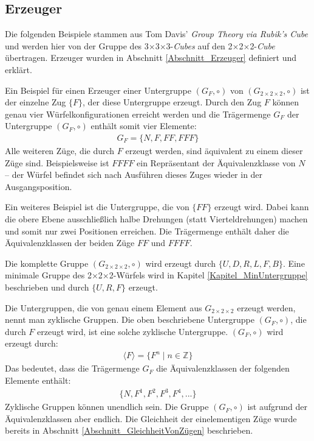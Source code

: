 \documentclass[12pt,a4paper, usenames, dvipsnames]{article}
\theoremstyle{mystyle}
\theoremstyle{definition}
\newcommand{\Gtwo}{\ensuremath{G_{2\times 2\times 2}}}
\newcommand{\Ttwo}{2$\times$2$\times$2-}
\newcommand{\Tthree}{3$\times$3$\times$3-}
\begin{document}
%
%
%
%
%
%
%
%
%
%
%
%
%
%
%
%
%
%
%
%

\subsection{Erzeuger}
\label{Abschnitt_ErzeugerGF}

Die folgenden Beispiele stammen aus Tom Davis' \textit{Group Theory via Rubik's Cube} \cite{TD} und werden hier von der Gruppe des \Tthree \textit{Cubes} auf den \Ttwo \textit{Cube} übertragen. Erzeuger wurden in Abschnitt \ref{Abschnitt_Erzeuger} definiert und erklärt.


Ein Beispiel für einen Erzeuger einer Untergruppe $(G_F, \circ)$ von $(\Gtwo, \circ)$ ist der einzelne Zug $\{ F \}$, der diese Untergruppe erzeugt. Durch den Zug $F$ können genau vier Würfelkonfigurationen erreicht werden und die Trägermenge $G_F$ der Untergruppe $(G_F, \circ)$ enthält somit vier Elemente:
\begin{align*}
G_F = \{N, F, FF, FFF\}
\end{align*}
Alle weiteren Züge, die durch $F$ erzeugt werden, sind äquivalent zu einem dieser Züge sind. Beispielsweise ist $FFFF$ ein Repräsentant der Äquivalenzklasse von $N$ -- der Würfel befindet sich nach Ausführen dieses Zuges wieder in der Ausgangsposition.


Ein weiteres Beispiel ist die Untergruppe, die von $\{FF\}$ erzeugt wird. Dabei kann die obere Ebene ausschließlich halbe Drehungen (statt Vierteldrehungen) machen und somit nur zwei Positionen erreichen. Die Trägermenge enthält daher die Äquivalenzklassen der beiden Züge $FF$ und $FFFF$.


Die komplette Gruppe $(\Gtwo, \circ)$ wird erzeugt durch $\{U, D, R, L, F, B\}$. Eine minimale Gruppe des \Ttwo Würfels wird in Kapitel \ref{Kapitel_MinUntergruppe} beschrieben und durch $\{U, R, F\}$ erzeugt.

Die Untergruppen, die von genau einem Element aus $\Gtwo$ erzeugt werden, nennt man zyklische Gruppen. Die oben beschriebene Untergruppe $(G_F, \circ)$, die durch $ F $ erzeugt wird, ist eine solche zyklische Untergruppe.
$(G_F, \circ)$ wird erzeugt durch:
\begin{align*}
\langle F \rangle = \{ F^n \mid n \in \mathbb{Z}\}
\end{align*}
Das bedeutet, dass die Trägermenge $G_F$ die Äquivalenzklassen der folgenden Elemente enthält: 
\begin{align*}
\{N, F^1, F^2, F^3, F^4, ...\}
\end{align*}
Zyklische Gruppen können unendlich sein. Die Gruppe $(G_F,  \circ)$ ist aufgrund der Äquivalenzklassen aber endlich. Die Gleichheit der einelementigen Züge wurde bereits in Abschnitt \ref{Abschnitt_GleichheitVonZügen} beschrieben.
\end{document}
